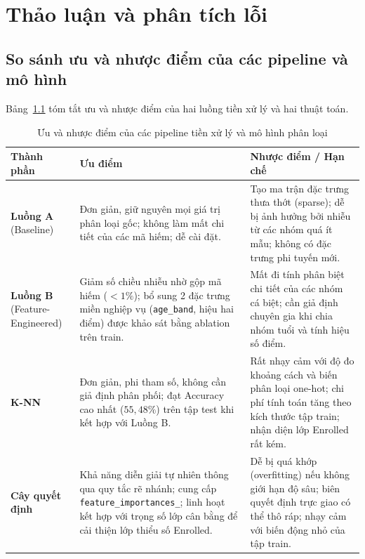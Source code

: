 \chapter{Thảo luận và phân tích lỗi}

\section{So sánh ưu và nhược điểm của các pipeline và mô hình}
Bảng~\ref{tab:pros-cons} tóm tắt ưu và nhược điểm của hai luồng tiền xử lý và hai thuật toán.

\begin{table}[H]\centering\small
\caption{Ưu và nhược điểm của các pipeline tiền xử lý và mô hình phân loại}\label{tab:pros-cons}
\begin{tabular}{>{\raggedright\arraybackslash}p{2.6cm}>{\raggedright\arraybackslash}p{5.2cm}>{\raggedright\arraybackslash}p{5.4cm}}\toprule
Thành phần & Ưu điểm & Nhược điểm / Hạn chế\\\midrule
\textbf{Luồng A} (Baseline) & Đơn giản, giữ nguyên mọi giá trị phân loại gốc; không làm mất chi tiết của các mã hiếm; dễ cài đặt. & Tạo ma trận đặc trưng thưa thớt (sparse); dễ bị ảnh hưởng bởi nhiễu từ các nhóm quá ít mẫu; không có đặc trưng phi tuyến mới.\\\midrule
\textbf{Luồng B} (Feature-Engineered) & Giảm số chiều nhiễu nhờ gộp mã hiếm ($<1\%$); bổ sung 2 đặc trưng miền nghiệp vụ (\texttt{age\_band}, hiệu hai điểm) được khảo sát bằng ablation trên train. & Mất đi tính phân biệt chi tiết của các nhóm cá biệt; cần giả định chuyên gia khi chia nhóm tuổi và tính hiệu số điểm.\\\midrule
\textbf{K-NN} & Đơn giản, phi tham số, không cần giả định phân phối; đạt Accuracy cao nhất ($55{,}48\%$) trên tập test khi kết hợp với Luồng B. & Rất nhạy cảm với độ đo khoảng cách và biến phân loại one-hot; chi phí tính toán tăng theo kích thước tập train; nhận diện lớp Enrolled rất kém.\\\midrule
\textbf{Cây quyết định} & Khả năng diễn giải tự nhiên thông qua quy tắc rẽ nhánh; cung cấp \texttt{feature\_importances\_}; linh hoạt kết hợp với trọng số lớp cân bằng để cải thiện lớp thiểu số Enrolled. & Dễ bị quá khớp (overfitting) nếu không giới hạn độ sâu; biên quyết định trực giao có thể thô ráp; nhạy cảm với biến động nhỏ của tập train.\\
\bottomrule\end{tabular}
\end{table}

